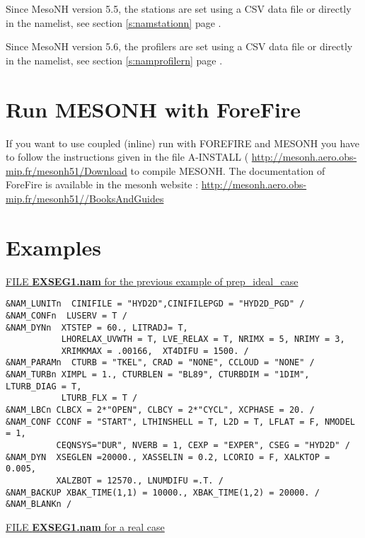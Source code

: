 Since MesoNH version 5.5, the stations are set using a CSV data file or directly in the namelist, see section \ref{s:namstationn} page \pageref{s:namstationn}.

Since MesoNH version 5.6, the profilers are set using a CSV data file or directly in the namelist, see section \ref{s:namprofilern} page \pageref{s:namprofilern}.

\newpage
\section{Run MESONH with ForeFire}
 If you want to use coupled (inline) run with FOREFIRE and MESONH you have to follow the instructions given in  the file A-INSTALL ( \url{http://mesonh.aero.obs-mip.fr/mesonh51/Download} to compile MESONH.
The documentation of ForeFire  is available in the mesonh website : \url{http://mesonh.aero.obs-mip.fr/mesonh51//BooksAndGuides}


\section{Examples }

\underline{FILE {\bf EXSEG1.nam} for the previous example of prep\_ideal\_case}

\begin{verbatim}
&NAM_LUNITn  CINIFILE = "HYD2D",CINIFILEPGD = "HYD2D_PGD" /
&NAM_CONFn  LUSERV = T /
&NAM_DYNn  XTSTEP = 60., LITRADJ= T,
           LHORELAX_UVWTH = T, LVE_RELAX = T, NRIMX = 5, NRIMY = 3, 
           XRIMKMAX = .00166,  XT4DIFU = 1500. /
&NAM_PARAMn  CTURB = "TKEL", CRAD = "NONE", CCLOUD = "NONE" /
&NAM_TURBn XIMPL = 1., CTURBLEN = "BL89", CTURBDIM = "1DIM", LTURB_DIAG = T,
           LTURB_FLX = T /
&NAM_LBCn CLBCX = 2*"OPEN", CLBCY = 2*"CYCL", XCPHASE = 20. /
&NAM_CONF CCONF = "START", LTHINSHELL = T, L2D = T, LFLAT = F, NMODEL = 1, 
          CEQNSYS="DUR", NVERB = 1, CEXP = "EXPER", CSEG = "HYD2D" /
&NAM_DYN  XSEGLEN =20000., XASSELIN = 0.2, LCORIO = F, XALKTOP = 0.005,
          XALZBOT = 12570., LNUMDIFU =.T. /
&NAM_BACKUP XBAK_TIME(1,1) = 10000., XBAK_TIME(1,2) = 20000. /
&NAM_BLANKn /
\end{verbatim}
\newpage
\underline{FILE {\bf EXSEG1.nam} for a real case}

